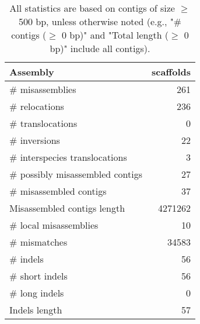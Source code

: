 \documentclass[12pt,a4paper]{article}
\begin{document}
\begin{table}[ht]
\begin{center}
\caption{All statistics are based on contigs of size $\geq$ 500 bp, unless otherwise noted (e.g., "\# contigs ($\geq$ 0 bp)" and "Total length ($\geq$ 0 bp)" include all contigs).}
\begin{tabular}{|l*{1}{|r}|}
\hline
Assembly & scaffolds \\ \hline
\# misassemblies & 261 \\ \hline
\hspace{5mm}\# relocations & 236 \\ \hline
\hspace{5mm}\# translocations & 0 \\ \hline
\hspace{5mm}\# inversions & 22 \\ \hline
\hspace{5mm}\# interspecies translocations & 3 \\ \hline
\# possibly misassembled contigs & 27 \\ \hline
\# misassembled contigs & 37 \\ \hline
Misassembled contigs length & 4271262 \\ \hline
\# local misassemblies & 10 \\ \hline
\# mismatches & 34583 \\ \hline
\# indels & 56 \\ \hline
\hspace{5mm}\# short indels & 56 \\ \hline
\hspace{5mm}\# long indels & 0 \\ \hline
Indels length & 57 \\ \hline
\end{tabular}
\end{center}
\end{table}
\end{document}
